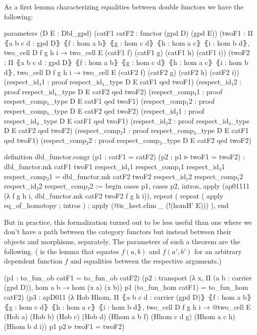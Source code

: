 As a first lemma characterizing equalities between double functors we have the
following:

\begin{leancodebr}
  parameters (D E : Dbl_gpd)
    (catF1 catF2 : functor (gpd D) (gpd E))
    (twoF1 : Π ⦃a b c d : gpd D⦄
      ⦃f : hom a b⦄ ⦃g : hom c d⦄ ⦃h : hom a c⦄ ⦃i : hom b d⦄,
      two_cell D f g h i → two_cell E (catF1 f) (catF1 g) (catF1 h) (catF1 i))
    (twoF2 : Π ⦃a b c d : gpd D⦄
      ⦃f : hom a b⦄ ⦃g : hom c d⦄ ⦃h : hom a c⦄ ⦃i : hom b d⦄,
      two_cell D f g h i → two_cell E (catF2 f) (catF2 g) (catF2 h) (catF2 i))
    (respect_id₁1 : proof respect_id₁_type D E catF1 qed twoF1)
    (respect_id₁2 : proof respect_id₁_type D E catF2 qed twoF2)
    (respect_comp₁1 : proof respect_comp₁_type D E catF1 qed twoF1)
    (respect_comp₁2 : proof respect_comp₁_type D E catF2 qed twoF2)
    (respect_id₂1 : proof respect_id₂_type D E catF1 qed twoF1)
    (respect_id₂2 : proof respect_id₂_type D E catF2 qed twoF2)
    (respect_comp₂1 : proof respect_comp₂_type D E catF1 qed twoF1)
    (respect_comp₂2 : proof respect_comp₂_type D E catF2 qed twoF2) 

  definition dbl_functor.congr (p1 : catF1 = catF2) (p2 : p1 ▹ twoF1 = twoF2) :
    dbl_functor.mk catF1 twoF1 
      respect_id₁1 respect_comp₁1 respect_id₂1 respect_comp₂1
    = dbl_functor.mk catF2 twoF2 
      respect_id₁2 respect_comp₁2 respect_id₂2 respect_comp₂2 :=
  begin
    cases p1, cases p2,
    intros, apply (ap01111 (λ f g h i, dbl_functor.mk catF2 twoF2 f g h i)),
      repeat (
        repeat ( apply eq_of_homotopy ; intros ) ;
        apply (@is_hset.elim _ (!(homH' E))) ),
  end
\end{leancodebr}

But in practice, this formalization turned out to be less useful than one where
we don't have a path between the category functors but instead between their
objects and morphisms, separately.
The parameters of such a theorem  are the following.
( is the lemma that equates $f(a,b)$ and $f(a',b')$ for an
arbitrary dependent function $f$ and equalities between the respective
arguments.)
\begin{leancodebr}
    (p1 : to_fun_ob catF1 = to_fun_ob catF2)
    (p2 : transport
      (λ x, Π (a b : carrier (gpd D)), hom a b → hom (x a) (x b)) p1
      (to_fun_hom catF1) = to_fun_hom catF2)
    (p3 : apD011 (λ Hob Hhom,
                  Π ⦃a b c d : carrier (gpd D)⦄
                    ⦃f : hom a b⦄ ⦃g : hom c d⦄ ⦃h : hom a c⦄ ⦃i : hom b d⦄,
                    two_cell D f g h i →
                    @two_cell E (Hob a) (Hob b) (Hob c) (Hob d)
                     (Hhom a b f) (Hhom c d g) (Hhom a c h) (Hhom b d i))
          p1 p2 ▹ twoF1 = twoF2)
\end{leancodebr}

